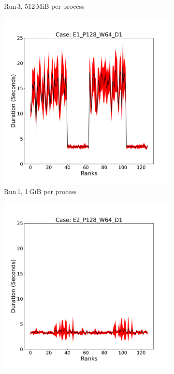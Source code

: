 \begin{figure}[h!]
\begin{subfigure}[b]{0.3\textwidth}
         \caption{Run\,3, 512\,MiB per process}
         \label{fig:E3_512_d11}
     \end{subfigure}
     \vfill
          \begin{subfigure}[b]{0.3\textwidth}
         \centering
         \includegraphics[width=\textwidth, height=\textwidth]{figures/deisa1__E1_P128_W64_D1.pdf}
         \caption{Run\,1, 1\,GiB per process}
         \label{fig:E1_1_d11}
     \end{subfigure}
     \hfill
     \begin{subfigure}[b]{0.3\textwidth}
         \centering
         \includegraphics[width=\textwidth, height=\textwidth]{figures/deisa1__E2_P128_W64_D1.pdf}

\end{subfigure}
\end{figure}
